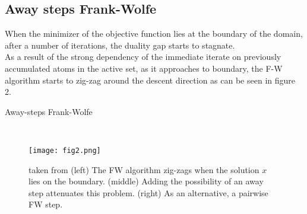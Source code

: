 \documentclass{article}
\begin{document}
\subsection{Away steps Frank-Wolfe}
When the minimizer of the objective function lies at the boundary of the domain, after a number of iterations, the duality gap starts to stagnate.\\
As a result of the strong dependency of the immediate iterate on previously accumulated atoms in the active set, as it approaches to boundary, the F-W algorithm starts to zig-zag around the descent direction as can be seen in figure 2.\\
\begin{algorithm}[tb]
   \caption{Away-steps Frank-Wolfe}
   \label{alg:example}
\begin{algorithmic}
    \\
    \ENDFOR
\end{algorithmic}
\end{algorithm}
\begin{figure}
  \texttt{[image: fig2.png]}
  \caption{taken from \cite{JaggiLacoste15} (left) The FW algorithm zig-zags when the solution $x$ lies on the boundary. (middle) Adding the possibility of an away step attenuates this problem. (right) As an alternative, a pairwise FW step.}
  \label{fig:Away steps}
\end{figure}
\end{document}
